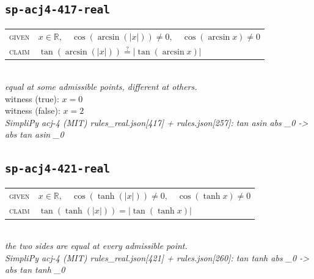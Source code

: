 \documentclass[11pt]{article}
\begin{document}
\subsection*{\texttt{sp-acj4-417-real}}
\begin{tabular}{@{}l@{\quad}l@{}}
\textsc{given} & $x \in \mathbb{R},\quad \cos\left(\arcsin\left(\left|x\right|\right)\right) \neq 0,\quad \cos\left(\arcsin x\right) \neq 0$ \\[4pt]
\textsc{claim} & $\displaystyle \tan\left(\arcsin\left(\left|x\right|\right)\right) \overset{?}{=} \left|\tan\left(\arcsin x\right)\right|$ \\
\end{tabular}\\[2pt]
{\small\emph{equal at some admissible points, different at others.}}\\
{\footnotesize\color{gray}witness (true): $x = 0$}\\
{\footnotesize\color{gray}witness (false): $x = 2$}\\
\emph{SimpliPy acj-4 (MIT) rules\_real.json[417] + rules.json[257]: tan asin abs \_0  ->  abs tan asin \_0}\\

\subsection*{\texttt{sp-acj4-421-real}}
\begin{tabular}{@{}l@{\quad}l@{}}
\textsc{given} & $x \in \mathbb{R},\quad \cos\left(\tanh\left(\left|x\right|\right)\right) \neq 0,\quad \cos\left(\tanh x\right) \neq 0$ \\[4pt]
\textsc{claim} & $\displaystyle \tan\left(\tanh\left(\left|x\right|\right)\right) = \left|\tan\left(\tanh x\right)\right|$ \\
\end{tabular}\\[2pt]
{\small\emph{the two sides are equal at every admissible point.}}\\
\emph{SimpliPy acj-4 (MIT) rules\_real.json[421] + rules.json[260]: tan tanh abs \_0  ->  abs tan tanh \_0}\\
\end{document}
